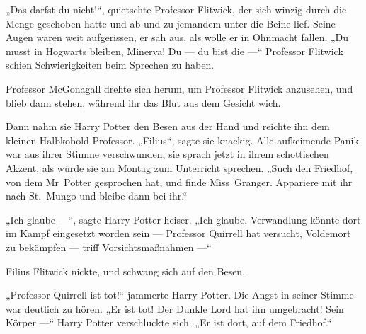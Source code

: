 „Das darfst du nicht!“, quietschte Professor Flitwick, der sich winzig durch die Menge geschoben hatte und ab und zu jemandem unter die Beine lief. Seine Augen waren weit aufgerissen, er sah aus, als wolle er in Ohnmacht fallen.
„Du musst in Hogwarts bleiben, Minerva! Du — du bist die —“
Professor Flitwick schien Schwierigkeiten beim Sprechen zu haben.

Professor McGonagall drehte sich herum, um Professor Flitwick anzusehen, und blieb dann stehen, während ihr das Blut aus dem Gesicht wich.

Dann nahm sie Harry Potter den Besen aus der Hand und reichte ihn dem kleinen Halbkobold Professor.
„Filius“, sagte sie knackig.
Alle aufkeimende Panik war aus ihrer Stimme verschwunden, sie sprach jetzt in ihrem schottischen Akzent, als würde sie am Montag zum Unterricht sprechen.
„Such den Friedhof, von dem Mr~Potter gesprochen hat, und finde Miss~Granger. Appariere mit ihr nach St.~Mungo und bleibe dann bei ihr.“

„Ich glaube —“, sagte Harry Potter heiser.
„Ich glaube, Verwandlung könnte dort im Kampf eingesetzt worden sein — Professor Quirrell hat versucht, Voldemort zu bekämpfen — triff Vorsichtsmaßnahmen —“

Filius Flitwick nickte, und schwang sich auf den Besen.

„Professor Quirrell ist tot!“ jammerte Harry Potter. Die Angst in seiner Stimme war deutlich zu hören.
„Er ist tot! Der Dunkle Lord hat ihn umgebracht! Sein Körper —“ Harry Potter verschluckte sich.
„Er ist dort, auf dem Friedhof.“

